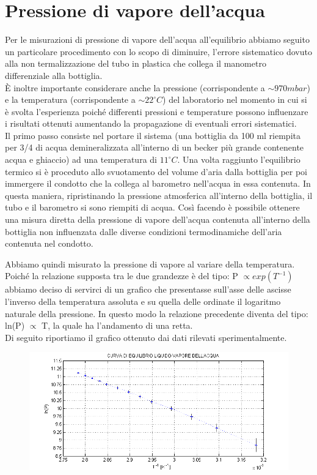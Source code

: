 \documentclass[11pt]{article}
\begin{document}
\section{Pressione di vapore dell'acqua}

Per le misurazioni di pressione di vapore dell'acqua all'equilibrio abbiamo seguito un particolare procedimento con lo scopo di diminuire, l'errore sistematico dovuto alla non termalizzazione del tubo in plastica che collega il manometro differenziale alla bottiglia.\\
È inoltre importante considerare anche la pressione  (corrispondente a $\sim 970 mbar$) e la temperatura (corrispondente a $\sim 22^\circ C$) del laboratorio nel momento in cui si è svolta l'esperienza poiché differenti pressioni e temperature possono influenzare i risultati ottenuti aumentando la propagazione di eventuali errori sistematici.\\
Il primo passo consiste nel portare il sistema (una bottiglia da 100 ml riempita per 3/4 di acqua demineralizzata all'interno di un becker più grande contenente acqua e ghiaccio) ad una temperatura di $11^\circ C$. Una volta raggiunto l'equilibrio termico si è proceduto allo svuotamento del volume d'aria dalla bottiglia per poi immergere il condotto che la collega al barometro nell'acqua in essa contenuta. In questa maniera, ripristinando la pressione atmosferica  all'interno della bottiglia, il tubo e il barometro si sono riempiti di acqua. Così facendo è possibile ottenere una misura diretta della pressione di vapore dell'acqua contenuta all'interno della bottiglia non influenzata dalle diverse condizioni termodinamiche dell'aria contenuta nel condotto.
 

Abbiamo quindi misurato la pressione di vapore al variare della temperatura. Poiché la relazione supposta tra le due grandezze è del tipo: P $\propto exp(T^{-1})$ abbiamo deciso di servirci di un grafico che presentasse sull'asse delle ascisse l'inverso della temperatura assoluta e su quella delle ordinate il logaritmo naturale della pressione. In questo modo la relazione precedente diventa del tipo: ln(P) $\propto$ T, la quale ha l'andamento di una retta.\\
Di seguito riportiamo il grafico ottenuto dai dati rilevati sperimentalmente.

\begin{figure}[H]
\hspace{-38mm}
\includegraphics[scale=1.10]{pressione_temperatura.png}
\caption{}
\label{}
\end{figure}
\end{document}
